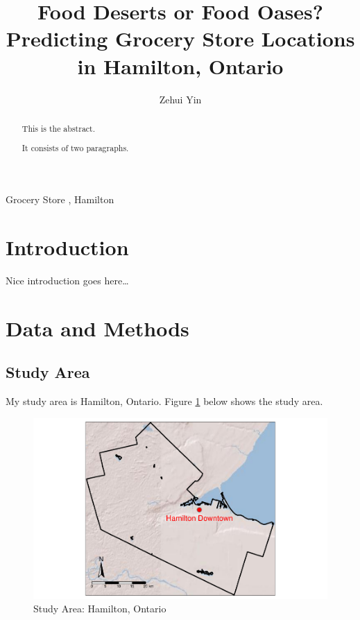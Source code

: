 \documentclass[preprint, 3p,
authoryear]{elsarticle} %
\begin{document}
\begin{frontmatter}

  \title{Food Deserts or Food Oases? Predicting Grocery Store Locations
in Hamilton, Ontario}
    \author[sees]{Zehui Yin%
  }
  
  \begin{abstract}
  This is the abstract.

  It consists of two paragraphs.
  \end{abstract}
    \begin{keyword}
    Grocery Store \sep 
    Hamilton
  \end{keyword}
  
 \end{frontmatter}

\section{Introduction}\label{introduction}

Nice introduction goes here\ldots{}

\section{Data and Methods}\label{data-and-methods}

\subsection{Study Area}\label{study-area}

My study area is Hamilton, Ontario. Figure \ref{fig::study_area} below
shows the study area.

\begin{figure}
\centering
\includegraphics{grocery_store_hamilton_files/figure-latex/unnamed-chunk-4-1.pdf}
\caption{\label{fig::study_area}Study Area: Hamilton, Ontario}
\end{figure}
\end{document}
